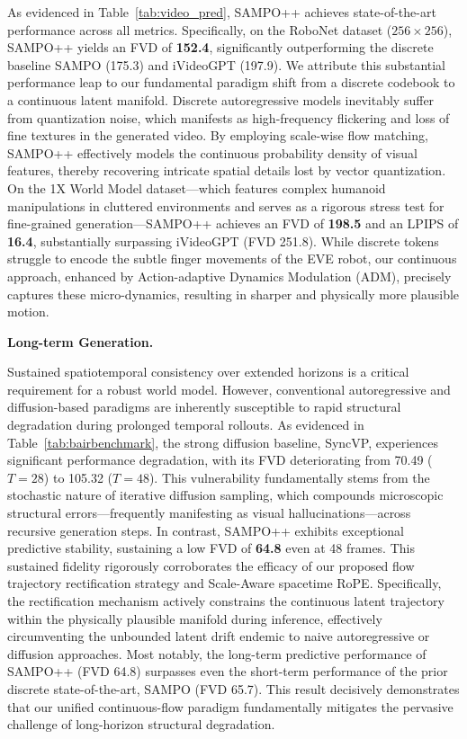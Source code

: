 As evidenced in Table~\ref{tab:video_pred}, SAMPO++ achieves state-of-the-art performance across all metrics. Specifically, on the RoboNet dataset ($256 \times 256$), SAMPO++ yields an FVD of \textbf{152.4}, significantly outperforming the discrete baseline SAMPO (175.3) and iVideoGPT (197.9). We attribute this substantial performance leap to our fundamental paradigm shift from a discrete codebook to a continuous latent manifold. Discrete autoregressive models inevitably suffer from quantization noise, which manifests as high-frequency flickering and loss of fine textures in the generated video. By employing scale-wise flow matching, SAMPO++ effectively models the continuous probability density of visual features, thereby recovering intricate spatial details lost by vector quantization.
On the 1X World Model dataset—which features complex humanoid manipulations in cluttered environments and serves as a rigorous stress test for fine-grained generation—SAMPO++ achieves an FVD of \textbf{198.5} and an LPIPS of \textbf{16.4}, substantially surpassing iVideoGPT (FVD 251.8). While discrete tokens struggle to encode the subtle finger movements of the EVE robot, our continuous approach, enhanced by Action-adaptive Dynamics Modulation (ADM), precisely captures these micro-dynamics, resulting in sharper and physically more plausible motion.


\textbf{Long-term Generation.}

Sustained spatiotemporal consistency over extended horizons is a critical requirement for a robust world model. However, conventional autoregressive and diffusion-based paradigms are inherently susceptible to rapid structural degradation during prolonged temporal rollouts. As evidenced in Table~\ref{tab:bairbenchmark}, the strong diffusion baseline, SyncVP, experiences significant performance degradation, with its FVD deteriorating from 70.49 ($T=28$) to 105.32 ($T=48$). This vulnerability fundamentally stems from the stochastic nature of iterative diffusion sampling, which compounds microscopic structural errors—frequently manifesting as visual hallucinations—across recursive generation steps.
In contrast, SAMPO++ exhibits exceptional predictive stability, sustaining a low FVD of \textbf{64.8} even at 48 frames. This sustained fidelity rigorously corroborates the efficacy of our proposed flow trajectory rectification strategy and Scale-Aware spacetime RoPE. Specifically, the rectification mechanism actively constrains the continuous latent trajectory within the physically plausible manifold during inference, effectively circumventing the unbounded latent drift endemic to naive autoregressive or diffusion approaches. Most notably, the long-term predictive performance of SAMPO++ (FVD 64.8) surpasses even the short-term performance of the prior discrete state-of-the-art, SAMPO (FVD 65.7). This result decisively demonstrates that our unified continuous-flow paradigm fundamentally mitigates the pervasive challenge of long-horizon structural degradation.

